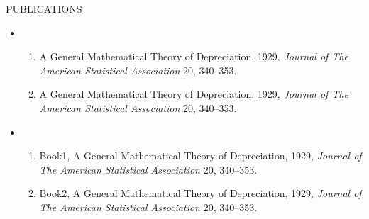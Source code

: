 

\begin{tcolorbox}
    [
    width=\textwidth, 
    colframe=WhiteSmoke,
    colback=LinkedInBlue,
    arc=1mm,
    ]
    \color{WhiteSmoke}
    \centerline{\Large PUBLICATIONS}
\end{tcolorbox}


\begin{itemize}


\item 
{\color{LinkedInBlue} }\\
\vspace{-0.25in}

    \begin{enumerate}
    
    \item
        A General Mathematical Theory of Depreciation, 1929, 
        {\it Journal of The American Statistical Association} 20, 340--353.
    \item
        A General Mathematical Theory of Depreciation, 1929,
        {\it Journal of The American Statistical Association} 20, 340--353.
    \end{enumerate}


\item
{\color{LinkedInBlue} }\\
\vspace{-0.25in}

    \begin{enumerate}
    \item
        Book1, A General Mathematical Theory of Depreciation, 1929, 
        {\it Journal of The American Statistical Association} 20, 340--353.
    \item
        Book2, A General Mathematical Theory of Depreciation, 1929,
        {\it Journal of The American Statistical Association} 20, 340--353.
    \end{enumerate}

\end{itemize}

\vspace{1in}

